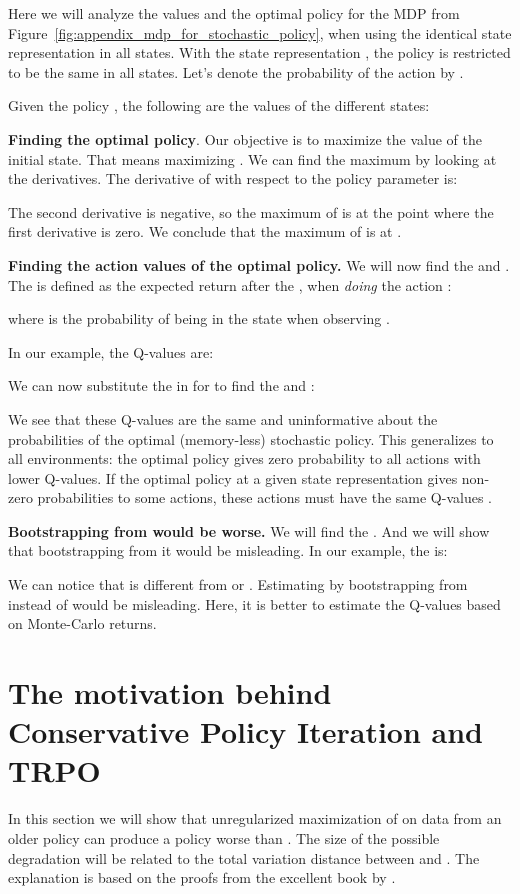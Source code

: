 \documentclass{article}
\begin{document}
Here we will analyze the values and the optimal policy for the MDP from Figure~\ref{fig:appendix_mdp_for_stochastic_policy},
when using the identical state representation  in all states. With the state representation , the policy is restricted to be the same in all states. Let's denote the probability of the  action by .

Given the policy , the following are the values of the different states:


\textbf{Finding the optimal policy}.
Our objective is to maximize the value of the initial state. That means maximizing . We can find the maximum by looking at the derivatives. The derivative of  with respect to the policy parameter is:

The second derivative is negative, so the maximum of  is at the point where the first derivative is zero.
We conclude that the maximum of  is at .

\textbf{Finding the action values of the optimal policy.}
We will now find the  and .
The  is defined as the expected return after the , when \emph{doing} the action  \citep{singh1994learning}:

where  is the probability of being in the state  when observing .

In our example, the Q-values are:


We can now substitute the  in for  to find the  and :

We see that these Q-values are the same and uninformative about the probabilities of the optimal (memory-less) stochastic policy. This generalizes to all environments: the optimal policy gives zero probability to all actions with lower Q-values. If the optimal policy  at a given state representation gives non-zero probabilities to some actions, these actions must have the same Q-values .

\textbf{Bootstrapping from  would be worse.} We will find the . And we will show that bootstrapping from it would be misleading. In our example, the  is:


We can notice that  is different from  or . Estimating  by bootstrapping from  instead of  would be misleading. Here, it is better to estimate the Q-values based on Monte-Carlo returns.

\section{The motivation behind Conservative Policy Iteration and TRPO}
\label{sec:cpi}
In this section we will show that unregularized maximization of  on data from an older policy  can produce a policy worse than . The size of the possible degradation will be related to the total variation distance between  and . The explanation is based on the proofs from the excellent book by  \citet{agarwal2020book}.
\end{document}
